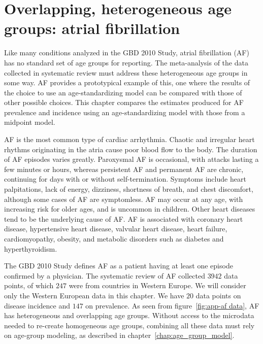 \chapter{Overlapping, heterogeneous age groups: atrial fibrillation}
\label{applications-age_groups}

Like many conditions analyzed in the GBD 2010 Study, atrial
fibrillation (AF) has no standard set of age groups for reporting.  The
meta-analysis of the data collected in systematic review must address
these heterogeneous age groups in some way. AF provides a prototypical
example of this, one where the results of the choice to
use an age-standardizing model can be compared with those of other possible
choices.  This chapter compares the estimates produced for AF
prevalence and incidence using an age-standardizing model with those
from a midpoint model.

AF is the most common type of cardiac arrhythmia.  Chaotic and
irregular heart rhythms originating in the atria cause poor blood flow
to the body.  The duration of AF episodes varies greatly.
Paroxysmal AF is occasional, with attacks lasting a few minutes or hours,
whereas persistent AF and permanent AF are chronic, continuing for
days with or without self-termination.  Symptoms include
heart palpitations, lack of energy, dizziness, shortness of breath, and
chest discomfort, although some cases of AF are
symptomless.  AF may occur at any age, with increasing risk for older
ages, and is uncommon in children.  Other heart diseases tend to be
the underlying cause of AF.  AF is associated with coronary heart
disease, hypertensive heart disease, valvular heart disease, heart
failure, cardiomyopathy, obesity, and metabolic disorders such as
diabetes and hyperthyroidism. \cite{rich_epidemiology_2009,
  rho_asymptomatic_2005, fuster_acc/aha/esc_2006, radford_atrial_1977}

The GBD 2010 Study defines AF as a patient having at least one episode
confirmed by a physician.  The systematic review of AF collected $3942$
data points, of which $247$ were from countries in Western Europe.  We
will consider only the Western European data in this chapter.
We have $20$ data points on disease incidence and $147$ on prevalence.
As seen from figure~\ref{fig:app-af data}, AF has
heterogeneous and overlapping age groups.  Without access to the
microdata needed to re-create homogeneous age groups, combining all
these data must rely on age-group modeling, as described in
chapter~\ref{chap:age_group_model}.

